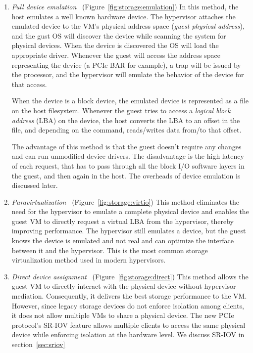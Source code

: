 \begin{enumerate}
\item
  \emph{Full device emulation}~\cite{sugerman2001virtualizing} (Figure~\ref{fig:storage:emulation})\quad
  In this method, the host emulates a well known hardware device.
  The hypervisor attaches the emulated device to the VM's physical address space (\emph{guest physical address}), and the gust OS will discover the device while scanning the system for physical devices. When the device is discovered
  the OS will load the appropriate driver. Whenever the guest will access the address space representing the device (a PCIe BAR for example), a trap will be issued by the processor, and the hypervisor will emulate the
  behavior of the device for that access.

  When the device is a block device, the emulated device is represented as a file on the host filesystem. Whenever the guest tries to access a \emph{logical block address} (LBA) on the device, the host converts the LBA to an offset
  in the file, and depending on the command, reads/writes data from/to that offset.

  The advantage of this method is that the guest doesn't require any changes and can run unmodified device drivers.
  The disadvantage is the high latency of each request, that has to pass through all the block I/O software layers in the guest, and then again in the host. 
  The overheads of device emulation is discussed later.

  
\item
  \emph{Paravirtualization}~\cite{barham2003xen,russell2008virtio} (Figure~\ref{fig:storage:virtio})\quad
  This method eliminates the need for the hypervisor to emulate a complete physical device and enables the guest VM to directly request a virtual LBA from the
  hypervisor, thereby improving performance. The hypervisor still emulates a device, but the guest knows the device is emulated and not real and can optimize the interface between it and the hypervisor. 
  This is the most common storage virtualization method used in modern hypervisors.

\item
  \emph{Direct device assignment}~\cite{raj2007high} (Figure~\ref{fig:storage:direct})\quad
  This method allows the guest VM to directly interact with the physical device without hypervisor mediation. 
  Consequently, it delivers the best storage performance to the VM. However, since legacy storage devices do not enforce isolation among clients, it does not allow multiple VMs to share a physical device. The new PCIe protocol's SR-IOV feature
  allows multiple clients to access the same physical device while enforcing isolation at the hardware level. We discuss SR-IOV in section~\ref{sec:sriov}
  

\end{enumerate}


